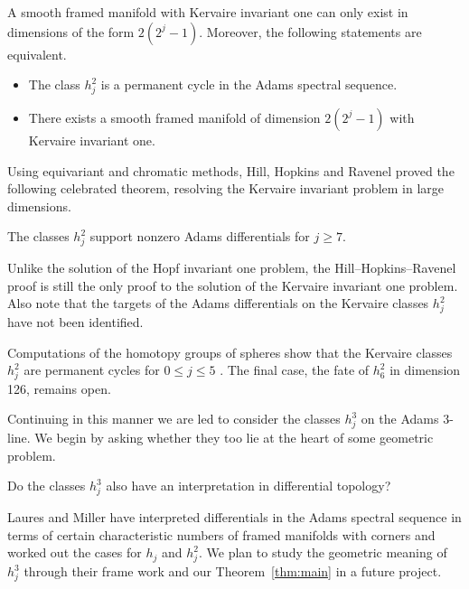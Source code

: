 \begin{thm}\label{thm: Ker inv}
  A smooth framed manifold with Kervaire invariant one can only exist in dimensions of the form $2(2^j-1)$.
  Moreover, the following statements are equivalent.
  \begin{itemize}
  \item The class $h_j^2$ is a permanent cycle in the Adams spectral sequence.
  \item There exists a smooth framed manifold of dimension $2(2^j-1)$ with Kervaire invariant one.
  \end{itemize}
\end{thm}

Using equivariant and chromatic methods, Hill, Hopkins and Ravenel 
proved the following celebrated theorem, resolving the Kervaire invariant problem in large dimensions.

\begin{thm} \label{thm: HHR}
The classes $h_j^2$ support nonzero Adams differentials for $j \geq 7$.%
\end{thm}

\begin{rmk}
Unlike the solution of the Hopf invariant one problem, the Hill--Hopkins--Ravenel proof is still the only proof to the solution of the Kervaire invariant one problem. Also note that the targets of the Adams differentials on the Kervaire classes $h_j^2$ have not been identified.
\end{rmk}

Computations of the homotopy groups of spheres show that the Kervaire classes $h_j^2$ are permanent cycles for $0 \leq j \leq 5$ \cite{BMT, BJM62, Xu}. The final case, the fate of $h_6^2$ in dimension 126, remains open.

Continuing in this manner we are led to consider the classes $h_j^3$ on the Adams $3$-line.
We begin by asking whether they too lie at the heart of some geometric problem.

\begin{qst}\label{qst: hj3 geo}
  Do the classes $h_j^3$ %
  also have an interpretation in differential topology?
\end{qst}

Laures and Miller \cite{Laures, Miller} have interpreted differentials in the Adams spectral sequence in terms of certain characteristic numbers of framed manifolds with corners and worked out the cases for $h_j$ and $h_j^2$. We plan to study the geometric meaning of $h_j^3$ through their frame work and our Theorem~\ref{thm:main} in a future project. 

